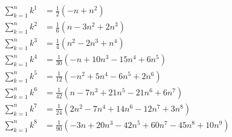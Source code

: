 \begin{equation*}
    \begin{split}
        \sum_{k=1}^{n} k^{1} &= \frac{1}{2} (-n + n^2) \\
        \sum_{k=1}^{n} k^{2} &= \frac{1}{6} (n - 3 n^2 + 2 n^3) \\
        \sum_{k=1}^{n} k^{3} &= \frac{1}{4} (n^2 - 2 n^3 + n^4) \\
        \sum_{k=1}^{n} k^{4} &= \frac{1}{30} (-n + 10 n^3 - 15 n^4 + 6 n^5) \\
        \sum_{k=1}^{n} k^{5} &= \frac{1}{12} (-n^2 + 5 n^4 - 6 n^5 + 2 n^6) \\
        \sum_{k=1}^{n} k^{6} &= \frac{1}{42} (n - 7 n^3 + 21 n^5 - 21 n^6 + 6 n^7) \\
        \sum_{k=1}^{n} k^{7} &= \frac{1}{24} (2 n^2 - 7 n^4 + 14 n^6 - 12 n^7 + 3 n^8) \\
        \sum_{k=1}^{n} k^{8} &= \frac{1}{90} (-3 n + 20 n^3 - 42 n^5 + 60 n^7 - 45 n^8 + 10 n^9) \\
    \end{split}
\end{equation*}